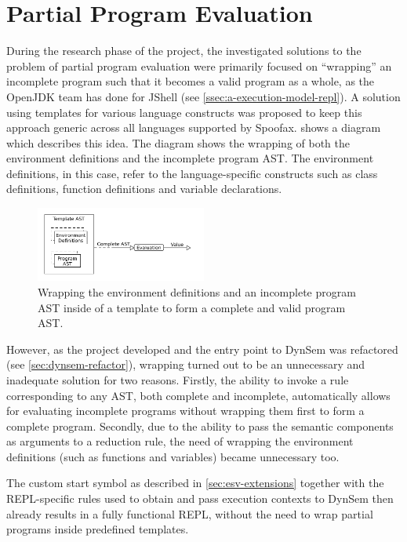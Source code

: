 \section{Partial Program Evaluation}
\label{sec:wrapping}

During the research phase of the project, the investigated solutions to the
problem of partial program evaluation were primarily focused on ``wrapping'' an
incomplete program such that it becomes a valid program as a whole, as the
OpenJDK team has done for JShell (see \cref{ssec:a-execution-model-repl}). A
solution using templates for various language constructs was proposed to keep
this approach generic across all languages supported by Spoofax.
 shows a diagram which describes this idea. The diagram shows
the wrapping of both the environment definitions and the incomplete program AST.
The environment definitions, in this case, refer to the language-specific
constructs such as class definitions, function definitions and variable
declarations.

\begin{figure}[b]
  \centering
  \includegraphics[width=0.5\textwidth]{wrapping}
  \caption{Wrapping the environment definitions and an incomplete program AST
    inside of a template to form a complete and valid program AST.}
  \label{fig:wrapping}
\end{figure}

However, as the project developed and the entry point to DynSem was refactored
(see \cref{sec:dynsem-refactor}), wrapping turned out to be an
unnecessary and inadequate solution for two reasons. Firstly, the ability to
invoke a rule corresponding to any AST, both complete and incomplete,
automatically allows for evaluating incomplete programs without wrapping them
first to form a complete program. Secondly, due to the ability to pass the
semantic components as arguments to a reduction rule, the need of wrapping the
environment definitions (such as functions and variables) became unnecessary
too.

The custom start symbol as described in \cref{sec:esv-extensions} together with
the REPL-specific rules used to obtain and pass execution contexts to DynSem
then already results in a fully functional REPL, without the need to wrap
partial programs inside predefined templates.

